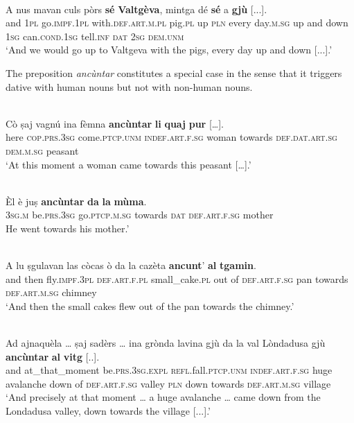 \ea
\label{}
\\
\gll    A nus mavan culs pòrs \textbf{sé} \textbf{Valtgèva}, mintga dé \textbf{sé} a \textbf{gjù} [...].\\
and\textbf{} \textsc{1pl}  go.\textsc{impf.1pl} with.\textsc{def.art.m.pl} pig.\textsc{pl} up \textsc{pln} every day.\textsc{m.sg} up and down  \textsc{1sg}  can.\textsc{cond.1sg}  tell.\textsc{inf}  \textsc{dat}  \textsc{2sg} \textsc{dem.unm}\\
\glt `And we would go up to Valtgeva with the pigs, every day up and down [...].'
\z

The preposition \textit{ancùntar} constitutes a special case in the sense that it triggers dative with human nouns but not with non-human nouns.

\ea
\label{}
\\
\gll Cò ṣaj	vagnú	ina fèmna \textbf{ancùntar} \textbf{li}	\textbf{quaj} \textbf{pur} […].\\
here \textsc{cop.prs.3sg} come.\textsc{ptcp.unm} \textsc{indef.art.f.sg} woman towards \textsc{def.dat.art.sg} \textsc{dem.m.sg} peasant \\
\glt `At this moment a woman came towards this peasant […].'
\z

\ea
\label{}
\\
\gll Èl è juṣ \textbf{ancùntar} \textbf{da} \textbf{la} \textbf{mùma}.\\
\textsc{3sg.m} be.\textsc{prs.3sg} go.\textsc{ptcp.m.sg} towards \textsc{dat} \textsc{def.art.f.sg} mother\\
\glt He went towards his mother.'
\z

\ea
\label{}
\\
\gll A lu ṣgulavan las còcas ò da la cazèta \textbf{ancunt}' \textbf{al} \textbf{tgamin}.\\
and then fly.\textsc{impf.3pl} \textsc{def.art.f.pl} small\_cake.\textsc{pl} out of \textsc{def.art.f.sg} pan towards \textsc{def.art.m.sg} chimney\\
\glt `And then the small cakes flew out of the pan towards the chimney.'
\z

\ea
\label{}
\\
\gll    Ad ajnaquèla … ṣaj sadèrs … ina grònda lavina gjù da la val Lòndadusa gjù \textbf{ancùntar} \textbf{al} \textbf{vitg} [..].\\
and at\_that\_moment {} be.\textsc{prs.3sg.expl} \textsc{refl.}fall.\textsc{ptcp.unm} {} \textsc{indef.art.f.sg} huge avalanche down of \textsc{def.art.f.sg} valley \textsc{pln} down towards \textsc{def.art.m.sg} village\\
\glt `And precisely at that moment … a huge avalanche … came down from the Londadusa valley, down towards the village [...].'
\z

